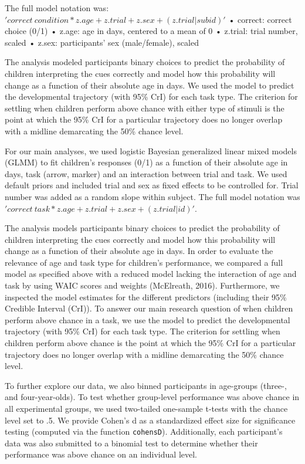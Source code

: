\documentclass[
  man]{apa6}
\begin{document}
The full model notation was: \('correct~condition*z.age+z.trial+z.sex+(z.trial|subid)'\)
• correct: correct choice (0/1)
• z.age: age in days, centered to a mean of 0
• z.trial: trial number, scaled
• z.sex: participants' sex (male/female), scaled

The analysis modeled participants binary choices to predict the probability of children interpreting the cues correctly and model how this probability will change as a function of their absolute age in days. We used the model to predict the
developmental trajectory (with 95\% CrI) for each task type. The criterion for settling when children perform above chance with either type of stimuli is the point at which the 95\% CrI for a particular trajectory does no longer overlap with a midline demarcating the 50\% chance level.

For our main analyses, we used logistic Bayesian generalized linear mixed models (GLMM) to fit children's responses (0/1) as a function of their absolute age in days, task (arrow, marker) and an interaction between trial and task. We used default priors and included trial and sex as fixed effects to be controlled for. Trial number was added as a random slope within subject. The full model notation was \('correct ~ task*z.age +z.trial +z.sex +(z.trial|id)'\).

The analysis models participants binary choices to predict the probability of children interpreting the cues correctly and model how this probability will change as a function of their absolute age in days. In order to evaluate the relevance of age and task type for children's performance, we compared a full model as specified above with a reduced model lacking the interaction of age and task by using WAIC scores and weights (McElreath, 2016). Furthermore, we inspected the model estimates for the different predictors (including their 95\% Credible Interval (CrI)). To answer our main research question of when children perform above chance in a task, we use the model to predict the developmental trajectory (with 95\% CrI) for each task type. The criterion for settling when children perform above chance is the point at which the 95\% CrI for a particular trajectory does no longer overlap with a midline demarcating the 50\% chance level.

To further explore our data, we also binned participants in age-groups (three-, and four-year-olds). To test whether group-level performance was above chance in all experimental groups, we used two-tailed one-sample t-tests with the chance level set to .5. We provide Cohen's d as a standardized effect size for significance testing (computed via the function \texttt{cohensD}). Additionally, each participant's data was also submitted to a binomial test to determine whether their performance was above chance on an individual level.
\end{document}
